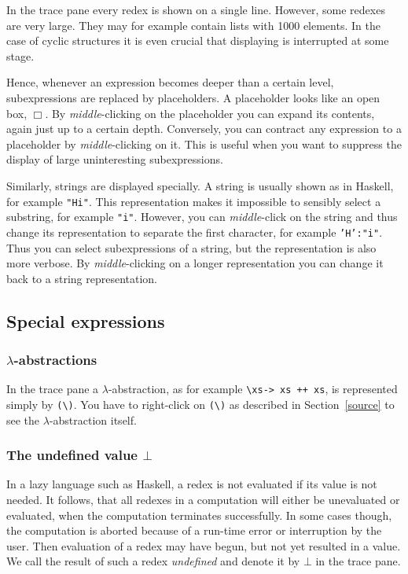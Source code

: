 \documentclass[12pt]{article}
\newcommand{\emptyBox}{\Box}
\begin{document}
In the trace pane every redex is shown on a single line.
However, some redexes are very large. They may for example contain lists with 1000 elements. In the case of cyclic structures it is even crucial that displaying is interrupted at some stage. 

Hence, whenever an expression becomes deeper than a certain level, subexpressions are replaced by placeholders. A placeholder looks like an open box, $\emptyBox$. By \emph{middle}-clicking on the placeholder you can expand its contents, again just up to a certain depth. Conversely, you can contract any expression to a placeholder by \emph{middle}-clicking on it. This is useful when you want to suppress the display of large uninteresting subexpressions.

Similarly, strings are displayed specially. A string is usually shown as in Haskell, for example \texttt{"Hi"}. This representation makes it impossible to sensibly select a substring, for example \texttt{"i"}. However, you can \emph{middle}-click on the string and thus change its representation to separate the first character, for example \texttt{'H':"i"}. Thus you can select subexpressions of a string, but the representation is also more verbose. By \emph{middle}-clicking on a longer representation you can change it back to a string representation.


\subsection{Special expressions}

\subsubsection{$\lambda$-abstractions}

In the trace pane a $\lambda$-abstraction, as for example 
\verb?\xs-> xs ++ xs?,
is represented simply by \verb?(\)?.
You have to right-click on \verb?(\)? as described in Section~\ref{source} to see the $\lambda$-abstraction itself.

\subsubsection{The undefined value $\bot$}

In a lazy language such as Haskell, a redex is not evaluated if its value is not needed. It follows, that all redexes in a computation will either be unevaluated or evaluated, when the computation terminates successfully. In some cases though, the computation is aborted because of a run-time error or interruption by the user. Then evaluation of a redex may have begun, but not yet resulted in a value. We call the result of such a redex \emph{undefined} and denote it by $\bot$ in the trace pane.
\end{document}
